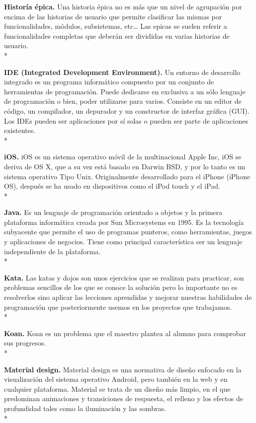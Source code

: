 \documentclass[../pfc.tex]{subfiles}
\begin{document}
	\textbf{Historía épica.}
	Una historia épica no es más que un nivel de agrupación por encima de las historias de usuario que permite clasificar las mismas por funcionalidades, módulos, subsistemas, etc… 
	Las epicas se suelen referir a funcionalidades completas que deberán ser divididas en varias historias de usuario.\\*
	
	\textbf{IDE (Integrated Development Environment).}
	Un entorno de desarrollo integrado es un programa
	informático compuesto por un conjunto de herramientas de programación. Puede dedicarse en
	exclusiva a un sólo lenguaje de programación o bien, poder utilizarse para varios. Consiste en un
	editor de código, un compilador, un depurador y un constructor de interfaz gráfica (GUI). Los IDEs
	pueden ser aplicaciones por sí solas o pueden ser parte de aplicaciones existentes.\\*
	
	\textbf{iOS.}
	iOS es un sistema operativo móvil de la multinacional Apple Inc, iOS se deriva de OS X, que a su vez está basado en Darwin BSD, y por lo tanto es un sistema operativo Tipo Unix. Originalmente desarrollado para el iPhone (iPhone OS), después se ha usado en dispositivos como el iPod touch y el iPad. \\*
	
	\textbf{Java.}
	Es un lenguaje de programación orientado a objetos y la primera plataforma informática
	creada por Sun Microsystems en 1995. Es la tecnología subyacente que permite el uso de
	programas punteros, como herramientas, juegos y aplicaciones de negocios. Tiene como principal
	característica ser un lenguaje independiente de la plataforma.\\*
	
	\textbf{Kata.}
	Las katas y dojos son unos ejercicios que se realizan para practicar, son problemas sencillos de los que se conoce la solución pero lo importante no es resolverlos sino aplicar las lecciones aprendidas y mejorar nuestras habilidades de programación que posteriormente usemos en los proyectos que trabajamos.\\*
	
	\textbf{Koan.}
	Koan es un problema que el maestro plantea al alumno para comprobar sus progresos.\\*
	
	\textbf{Material design.}
	Material design es una normativa de diseño enfocado en la visualización del sistema operativo Android, pero también en la web y en cualquier plataforma.  Material se trata de un diseño más limpio, en el que predominan animaciones y transiciones de respuesta, el relleno y los efectos de profundidad tales como la iluminación y las sombras.\\*
	
\end{document}
